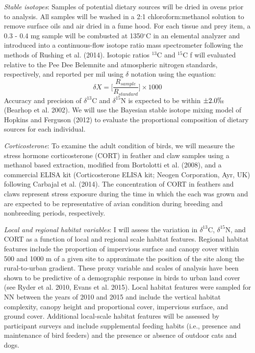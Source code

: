 \documentclass[12pt]{article}
\begin{document}
\noindent \textit{Stable isotopes}: Samples of potential dietary sources will be dried in ovens prior to analysis. All samples will be washed in a 2:1 chloroform:methanol solution to remove surface oils and air dried in a fume hood. For each tissue and prey item, a 0.3 - 0.4 mg sample will be combusted at 1350$^{\circ}$C in an elemental analyzer and introduced into a continuous-flow isotope ratio mass spectrometer following the methods of Rushing et al. (2014). Isotopic ratios $^{13}$C and $^{15}$C f will evaluated relative to the Pee Dee Belemnite and atmospheric nitrogen standards, respectively, and reported per mil using $\delta$ notation using the equation: $$\delta{X} = \bigg[ \frac{R_{sample}}{R_{standard}} \bigg] \times 1000$$
\noindent Accuracy and precision of $\delta^{13}$C and   $\delta^{15}$N is expected to be within $\pm 2.0 \permil$ (Bearhop et al. 2002). We will use the Bayesian stable isotope mixing model  of Hopkins and Ferguson (2012) to evaluate the proportional composition of dietary sources for each individual. \par

\noindent \textit{Corticosterone}:  To examine the adult condition of birds, we will measure the stress hormone corticosterone (CORT) in feather and claw samples using a methanol based extraction, modified from Bortolotti et al. (2008), and a commercial ELISA kit (Corticosterone ELISA kit; Neogen Corporation, Ayr, UK) following Carbajal et al. (2014). The concentration of CORT in feathers and claws represent stress exposure during the time in which the each was grown and are expected to be representative of avian condition during breeding and nonbreeding periods, respectively.\par 

\noindent \textit{Local and regional habitat variables}: I will assess the variation in $\delta^{13}$C,  $\delta^{15}$N, and CORT as a function of local and regional scale habitat features. Regional habitat features include the proportion of impervious surface and canopy cover within 500 and 1000 m of a given site to approximate the position of the site along the rural-to-urban gradient. These proxy variable and scales of analysis have been shown to be predictive of a demographic response in birds to urban land cover (see Ryder et al. 2010, Evans et al. 2015). Local habitat features were sampled for NN between the years of 2010 and 2015 and include the vertical habitat complexity, canopy height and proportional cover, impervious surface, and ground cover. Additional local-scale habitat features will be assessed by participant surveys and include supplemental feeding habits (i.e., presence and maintenance of bird feeders) and the presence or absence of outdoor cats and dogs. \par
\end{document}
